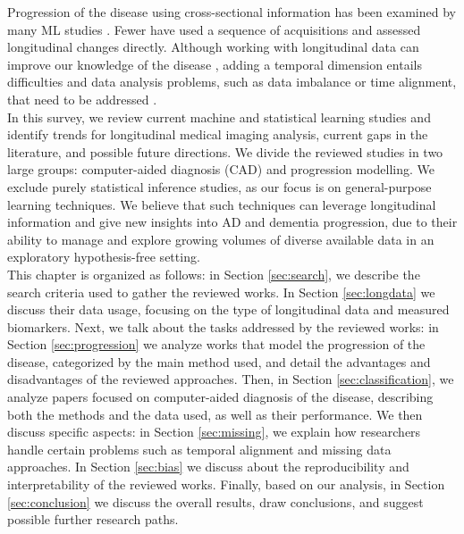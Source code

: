 Progression of the disease using cross-sectional information has been examined by many ML studies \cite{Oxtoby2017,Acharya2019}. Fewer have used a sequence of acquisitions and assessed longitudinal changes directly. Although working with longitudinal data can improve our knowledge of the disease \cite{Xu2014}, adding a temporal dimension entails difficulties and data analysis problems, such as data imbalance or time alignment, that need to be addressed \cite{Fitzmaurice2008,Ibrahim}. \\

In this survey, we review current machine and statistical learning studies and identify trends for longitudinal medical imaging analysis, current gaps in the literature, and possible future directions. We divide the reviewed studies in two large groups: computer-aided diagnosis (CAD) and progression modelling. We exclude purely statistical inference studies, as our focus is on general-purpose learning techniques. We believe that such techniques can leverage longitudinal information and give new insights into AD and dementia progression, due to their ability to manage and explore growing volumes of diverse available data in an exploratory hypothesis-free setting.\\


This chapter is organized as follows: in Section \ref{sec:search}, we describe the search criteria used to gather the reviewed works. In Section \ref{sec:longdata} we discuss their data usage, focusing on the type of longitudinal data and measured biomarkers. Next, we talk about the tasks addressed by the reviewed works: in Section \ref{sec:progression} we analyze works that model the progression of the disease, categorized by the main method used, and detail the advantages and disadvantages of the reviewed approaches. Then, in Section \ref{sec:classification}, we analyze papers focused on computer-aided diagnosis of the disease, describing both the methods and the data used, as well as their performance. We then discuss specific aspects: in Section \ref{sec:missing}, we explain how researchers handle certain problems such as temporal alignment and missing data approaches. In Section \ref{sec:bias} we discuss about the reproducibility and interpretability of the reviewed works. Finally, based on our analysis, in Section \ref{sec:conclusion} we discuss the overall results, draw conclusions, and suggest possible further research paths. \\

